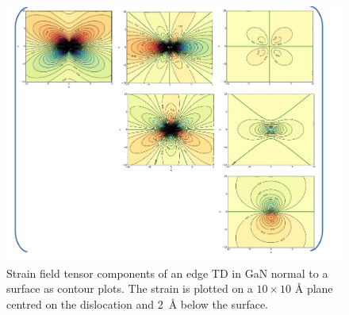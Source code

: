 \begin{figure}
    \centering
\includegraphics[width=1\linewidth]{Figures/edge_matrix.pdf}
\caption[Edge TD strain tensor.]{Strain field tensor components of an edge TD in GaN normal to a surface as contour plots. The strain is plotted on a $10 \times 10$ \si{\angstrom} plane centred on the dislocation and \SI{2}{\angstrom} below the surface.  }
\label{Fig:edgeMatrix}
\end{figure}

